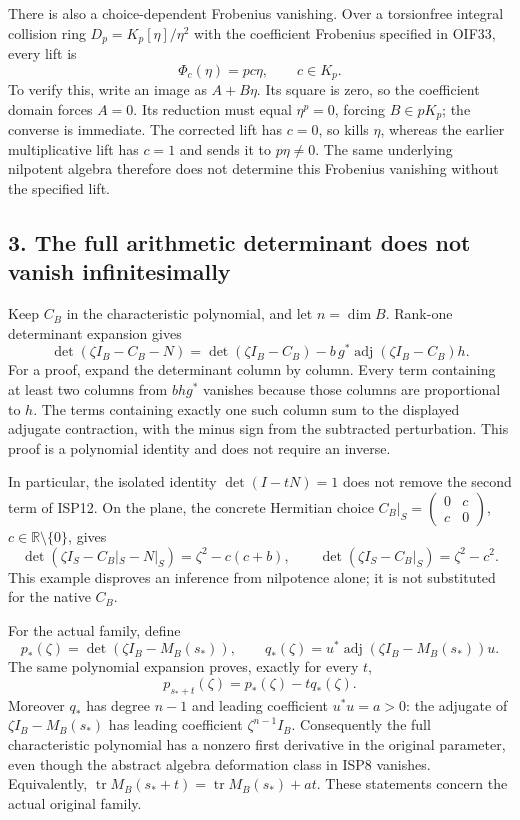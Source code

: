 \documentclass[
  10pt,
  a4paper,
]{article}
\begin{document}
There is also a choice-dependent Frobenius vanishing. Over a torsionfree
integral collision ring \(D_p=K_p[\eta]/\eta^2\) with the coefficient
Frobenius specified in OIF33, every lift is \[
\Phi_c(\eta)=pc\eta,\qquad c\in K_p.
\tag{ISP11}
\] To verify this, write an image as \(A+B\eta\). Its square is zero, so
the coefficient domain forces \(A=0\). Its reduction must equal
\(\eta^p=0\), forcing \(B\in pK_p\); the converse is immediate. The
corrected lift has \(c=0\), so kills \(\eta\), whereas the earlier
multiplicative lift has \(c=1\) and sends it to \(p\eta\ne0\). The same
underlying nilpotent algebra therefore does not determine this Frobenius
vanishing without the specified lift.

\subsection{3. The full arithmetic determinant does not vanish
infinitesimally}\label{the-full-arithmetic-determinant-does-not-vanish-infinitesimally}

Keep \(C_B\) in the characteristic polynomial, and let \(n=\dim B\).
Rank-one determinant expansion gives \[
\det(\zeta I_B-C_B-N)
=\det(\zeta I_B-C_B)
-b\,g^*\operatorname{adj}(\zeta I_B-C_B)h.
\tag{ISP12}
\] For a proof, expand the determinant column by column. Every term
containing at least two columns from \(bhg^*\) vanishes because those
columns are proportional to \(h\). The terms containing exactly one such
column sum to the displayed adjugate contraction, with the minus sign
from the subtracted perturbation. This proof is a polynomial identity
and does not require an inverse.

In particular, the isolated identity \(\det(I-tN)=1\) does not remove
the second term of ISP12. On the plane, the concrete Hermitian choice
\(C_B|_S=\left(\begin{smallmatrix}0&c\\c&0\end{smallmatrix}\right)\),
\(c\in\mathbb R\setminus\{0\}\), gives \[
\det(\zeta I_S-C_B|_S-N|_S)=\zeta^2-c(c+b),
\qquad \det(\zeta I_S-C_B|_S)=\zeta^2-c^2.
\tag{ISP13}
\] This example disproves an inference from nilpotence alone; it is not
substituted for the native \(C_B\).

For the actual family, define \[
p_*(\zeta)=\det(\zeta I_B-M_B(s_*)),\qquad
q_*(\zeta)=u^*\operatorname{adj}(\zeta I_B-M_B(s_*))u.
\] The same polynomial expansion proves, exactly for every \(t\), \[
p_{s_*+t}(\zeta)=p_*(\zeta)-tq_*(\zeta).
\tag{ISP14}
\] Moreover \(q_*\) has degree \(n-1\) and leading coefficient
\(u^*u=a>0\): the adjugate of \(\zeta I_B-M_B(s_*)\) has leading
coefficient \(\zeta^{n-1}I_B\). Consequently the full characteristic
polynomial has a nonzero first derivative in the original parameter,
even though the abstract algebra deformation class in ISP8 vanishes.
Equivalently,
\(\operatorname{tr}M_B(s_*+t)=\operatorname{tr}M_B(s_*)+at\). These
statements concern the actual original family.
\end{document}
